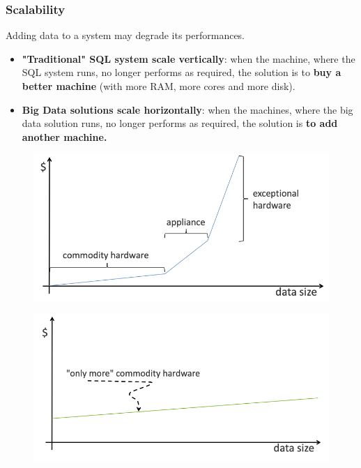 \documentclass[10pt,a4paper]{article}
\begin{document}
\subsubsection{Scalability}
Adding data to a system may degrade its performances.
\begin{itemize}
	\item \textbf{"Traditional" SQL system scale vertically}: when the machine, where the SQL system runs, no longer performs as required, the solution is to \textbf{buy a better machine} (with more RAM, more cores and more disk).
	\item \textbf{Big Data solutions scale horizontally}: when the machines, where the big data solution runs, no longer performs as required, the solution is \textbf{to add another machine.}
\end{itemize}
\begin{figure}[h!]
\centering
\begin{minipage}{.5\textwidth}
  \centering
   \includegraphics[width=.9\linewidth]{images/vertical-scalability}
  \label{fig:vertical}
\end{minipage}%
\begin{minipage}{.5\textwidth}
  \centering
  \includegraphics[width=.9\linewidth]{images/horizontal-scalability}
  \label{fig:horizontal}
\end{minipage}
\end{figure} 
\end{document}
